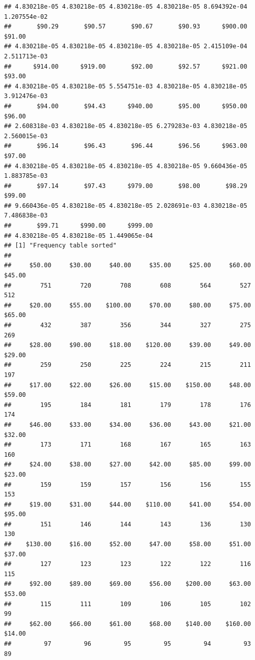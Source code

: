 \begin{verbatim}
## 4.830218e-05 4.830218e-05 4.830218e-05 4.830218e-05 8.694392e-04 1.207554e-02 
##       $90.29       $90.57       $90.67       $90.93      $900.00       $91.00 
## 4.830218e-05 4.830218e-05 4.830218e-05 4.830218e-05 2.415109e-04 2.511713e-03 
##      $914.00      $919.00       $92.00       $92.57      $921.00       $93.00 
## 4.830218e-05 4.830218e-05 5.554751e-03 4.830218e-05 4.830218e-05 3.912476e-03 
##       $94.00       $94.43      $940.00       $95.00      $950.00       $96.00 
## 2.608318e-03 4.830218e-05 4.830218e-05 6.279283e-03 4.830218e-05 2.560015e-03 
##       $96.14       $96.43       $96.44       $96.56      $963.00       $97.00 
## 4.830218e-05 4.830218e-05 4.830218e-05 4.830218e-05 9.660436e-05 1.883785e-03 
##       $97.14       $97.43      $979.00       $98.00       $98.29       $99.00 
## 9.660436e-05 4.830218e-05 4.830218e-05 2.028691e-03 4.830218e-05 7.486838e-03 
##       $99.71      $990.00      $999.00 
## 4.830218e-05 4.830218e-05 1.449065e-04 
## [1] "Frequency table sorted"
## 
##     $50.00     $30.00     $40.00     $35.00     $25.00     $60.00     $45.00 
##        751        720        708        608        564        527        512 
##     $20.00     $55.00    $100.00     $70.00     $80.00     $75.00     $65.00 
##        432        387        356        344        327        275        269 
##     $28.00     $90.00     $18.00    $120.00     $39.00     $49.00     $29.00 
##        259        250        225        224        215        211        197 
##     $17.00     $22.00     $26.00     $15.00    $150.00     $48.00     $59.00 
##        195        184        181        179        178        176        174 
##     $46.00     $33.00     $34.00     $36.00     $43.00     $21.00     $32.00 
##        173        171        168        167        165        163        160 
##     $24.00     $38.00     $27.00     $42.00     $85.00     $99.00     $23.00 
##        159        159        157        156        156        155        153 
##     $19.00     $31.00     $44.00    $110.00     $41.00     $54.00     $95.00 
##        151        146        144        143        136        130        130 
##    $130.00     $16.00     $52.00     $47.00     $58.00     $51.00     $37.00 
##        127        123        123        122        122        116        115 
##     $92.00     $89.00     $69.00     $56.00    $200.00     $63.00     $53.00 
##        115        111        109        106        105        102         99 
##     $62.00     $66.00     $61.00     $68.00    $140.00    $160.00     $14.00 
##         97         96         95         95         94         93         89 

\end{verbatim}
